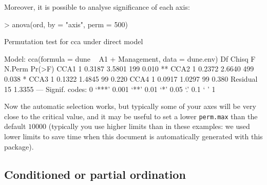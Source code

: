 \documentclass[a4paper,10pt]{amsart}
\begin{document}
Moreover, it is possible to analyse significance of each axis:
\begin{Schunk}
\begin{Sinput}
> anova(ord, by = "axis", perm = 500)
\end{Sinput}
\begin{Soutput}
Permutation test for cca under direct model

Model: cca(formula = dune ~ A1 + Management, data = dune.env)
         Df  Chisq      F N.Perm Pr(>F)   
CCA1      1 0.3187 3.5801    199  0.010 **
CCA2      1 0.2372 2.6640    499  0.038 * 
CCA3      1 0.1322 1.4845     99  0.220   
CCA4      1 0.0917 1.0297     99  0.380   
Residual 15 1.3355                        
---
Signif. codes:  0 ‘***’ 0.001 ‘**’ 0.01 ‘*’ 0.05 ‘.’ 0.1 ‘ ’ 1 
\end{Soutput}
\end{Schunk}
Now the automatic selection works, but typically some of your axes
will be very close to the critical value, and it may be useful to set
a lower \texttt{perm.max} than the default $10000$ (typically you use
higher limits than in these examples: we used lower limits to save
time when this document is automatically generated with this package).

\subsection{Conditioned or partial ordination}
\end{document}
